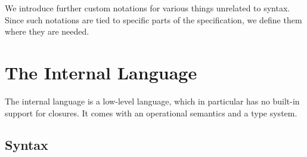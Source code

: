\documentclass{scrartcl}
\begin{document}
We introduce further custom notations for various things unrelated to
syntax. Since such notations are tied to specific parts of the
specification, we define them where they are needed.

\section{The Internal Language}
\label{the-internal-language}

The internal language is a low-level language, which in particular has
no built-in support for closures. It comes with an operational semantics
and a type system.

\subsection{Syntax}
\end{document}
